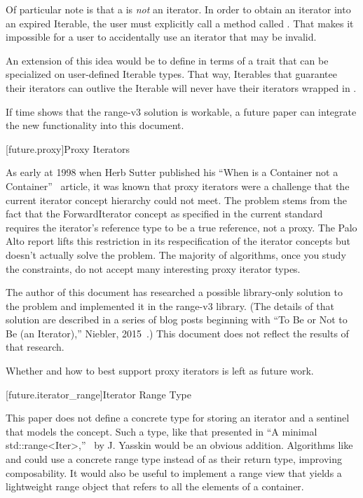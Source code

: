 \pnum
Of particular note is that a  is \textit{not} an iterator. In order to
obtain an iterator into an expired Iterable, the user must explicitly call a method called
. That makes it impossible for a user to accidentally use an iterator that may be
invalid.

\pnum
An extension of this idea would be to define  in terms of a trait that can be
specialized on user-defined Iterable types. That way, Iterables that guarantee their iterators can
outlive the Iterable will never have their iterators wrapped in .

\pnum
If time shows that the range-v3 solution is workable, a future paper can integrate the new
functionality into this document.

[future.proxy]{Proxy Iterators}

\pnum
As early at 1998 when Herb Sutter published his ``When is a Container not a Container''~\cite{Sutter1998}
article, it was known that proxy iterators were a challenge that the current iterator concept
hierarchy could not meet. The problem stems from the fact that the ForwardIterator concept as
specified in the current standard requires the iterator's reference type to be a true reference, not
a proxy. The Palo Alto report lifts this restriction in its respecification of the iterator
concepts but doesn't actually solve the problem. The majority of algorithms, once you study the
constraints, do not accept many interesting proxy iterator types.

\pnum
The author of this document has researched a possible library-only solution to the problem and
implemented it in the range-v3 library. (The details of that solution are described in a series of
blog posts beginning with ``To Be or Not to Be (an Iterator),'' Niebler, 2015~\cite{niebler2015}.) This
document does not reflect the results of that research.

Whether and how to best support proxy iterators is left as future work.

[future.iterator_range]{Iterator Range Type}

\pnum
This paper does not define a concrete type for storing an iterator and a sentinel that models the
 concept. Such a type, like that presented in ``A minimal std::range<Iter>,''~\cite{yasskin2012}
by J. Yasskin would be an obvious addition. Algorithms like  and
 could use a concrete range type instead of  as their return type,
improving composability. It would also be useful to implement a  range view that
yields a lightweight range object that refers to all the elements of a container.

